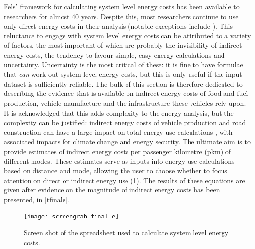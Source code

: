 Fels' framework for calculating system level energy costs has been available
to researchers for almost 40 years. Despite this, most researchers
continue to use only direct energy
costs in their analysis (notable exceptions include
\citealp{Treloar2004, Lenzen1999, MacKay2009, Lovelace2011-assessing}). %
This reluctance to engage with system level energy
costs can be attributed to a variety of factors, the most important
of which are probably the invisibility of indirect energy costs,
the tendency to favour simple, easy energy calculations and uncertainty.
Uncertainty is the most critical of these: it is fine to have formulae
that \emph{can} work out
system level energy costs, but this is only useful if the input dataset is
sufficiently reliable. The bulk of this section is therefore dedicated
to describing the evidence that is available on indirect energy costs of food
and fuel production, vehicle manufacture and the infrastructure these
vehicles rely upon. It is acknowledged that this adds complexity to the energy
analysis, but the complexity can be justified: indirect
energy costs of vehicle production and road construction can have a large
impact on total energy use calculations
\citep{Lovelace2011-assessing, Lenzen1999, Wee2000}, with associated impacts
for climate change and energy security. The ultimate aim is to provide
estimates of indirect energy costs per passenger kilometre (pkm) of
different modes. These estimates serve as inputs into energy use
calculations based on distance and mode, allowing the user to choose whether
to focus attention on direct or indirect energy use (\cref{screengrab-final-e}).
The results of these equations are given after evidence on
the magnitude of indirect energy costs has been presented, in \cref{tfinale}.

\begin{figure}[t]
 \begin{center}
 \texttt{[image: screengrab-final-e]}
\end{center}
 \caption{Screen shot of the spreadsheet used to calculate system level energy
 costs.}
 \label{screengrab-final-e}
\end{figure}



